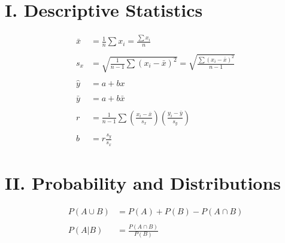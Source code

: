 \documentclass[
]{book}
\begin{document}
\hypertarget{i.-descriptive-statistics}{%
\section{I. Descriptive Statistics}\label{i.-descriptive-statistics}}

\[
\begin{aligned}
\bar x &= \frac{1}{n}\sum x_i = \frac{\sum x_i}{n} \\\\
s_x &= \sqrt{\frac{1}{n-1}\sum (x_i - \bar x)^2} = \sqrt{\frac{\sum(x_i -\bar x)^2}{n - 1}}\\\\
\hat y &= a + bx \\\\
\bar y &= a + b \bar x\\\\
r &= \frac{1}{n-1}\sum \left( \frac{x_i - \bar x}{s_x}\right) \left( \frac{y_i -\bar y}{s_y}\right)\\\\
b &= r \frac{s_y}{s_x}
\end{aligned}
\]

\hypertarget{ii.-probability-and-distributions}{%
\section{II. Probability and Distributions}\label{ii.-probability-and-distributions}}

\[
\begin{aligned}
P(A \cup B) &= P(A) + P(B) - P(A \cap B) \\\\
P(A | B) &= \frac{P(A \cap B)}{P(B)}
\end{aligned}
\]
\end{document}
